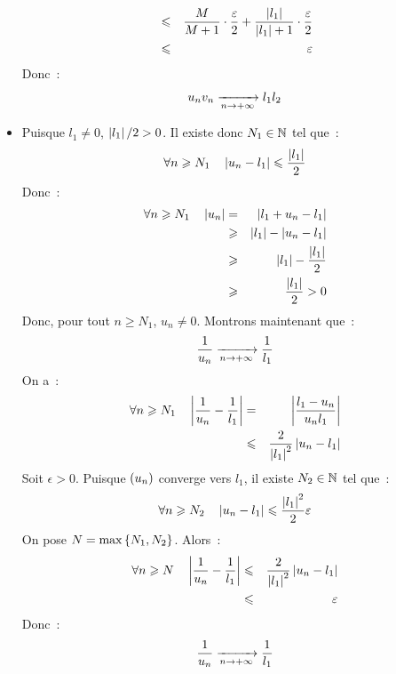 \documentclass{magnolia}
\begin{document}
\begin{preuve}
\begin{itemize}
\begin{eqnarray*}
  &\leqslant& \frac{M}{M+1}\cdot\frac{\varepsilon}{2}+
      \frac{\left|l_1\right|}{\left|l_1\right|+1}\cdot\frac{\varepsilon}{2}\\
  &\leqslant& \varepsilon
  \end{eqnarray*}
  Donc~:
  \[u_n v_n \xrightarrow[n\rightarrow +\infty]{} l_1 l_2\]
\item Puisque $l_1\neq 0$, $\left|l_1\right|/2>0$. Il existe donc $N_1\in\mathbb{N}$ tel que~:
  \[\forall n\geqslant N_1 \quad \left|u_n-l_1\right|\leqslant\frac{\left|l_1\right|}{2}\]
  Donc~:
  \begin{eqnarray*}
  \forall n\geqslant N_1 \quad \left|u_n\right|
  &=& \left|l_1+u_n-l_1\right|\\
  &\geqslant& \left|l_1\right|-\left|u_n-l_1\right|\\
  &\geqslant& \left|l_1\right|-\frac{\left|l_1\right|}{2}\\
  &\geqslant& \frac{\left|l_1\right|}{2} > 0
  \end{eqnarray*}
  Donc, pour tout $n\geq N_1$, $u_n\neq 0$. Montrons maintenant que~:
  \[\frac{1}{u_n} \xrightarrow[n\rightarrow +\infty]{} \frac{1}{l_1}\]
  On a~:
  \begin{eqnarray*}
  \forall n \geqslant N_1 \quad \left|\frac{1}{u_n}-\frac{1}{l_1}\right|
  &=& \left|\frac{l_1-u_n}{u_n l_1}\right|\\
  &\leqslant& \frac{2}{\left|l_1\right|^2} \left|u_n-l_1\right|
  \end{eqnarray*}
  Soit $\epsilon>0$. Puisque $\left(u_n\right)$ converge vers $l_1$, il existe $N_2\in\mathbb{N}$
  tel que~:
  \[\forall n\geqslant N_2 \quad \left|u_n-l_1\right|\leqslant \frac{\left|l_1\right|^2}{2}\varepsilon\]
  On pose $N=\max\left\{N_1,N_2\right\}$. Alors~:
  \begin{eqnarray*}
  \forall n \geqslant N \quad \left|\frac{1}{u_n}-\frac{1}{l_1}\right|
  &\leqslant& \frac{2}{\left|l_1\right|^2} \left|u_n-l_1\right|\\
  &\leqslant& \varepsilon
  \end{eqnarray*}
  Donc~:
  \[\frac{1}{u_n}\xrightarrow[n\rightarrow +\infty]{}\frac{1}{l_1}\]
\end{itemize} 
\end{preuve}
\end{document}
